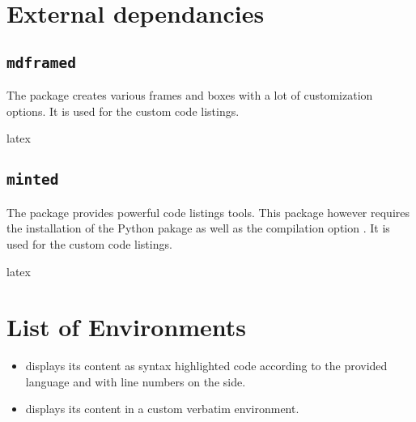 \documentclass{report}
\begin{document}
\section{External dependancies}


\subsection{\texttt{mdframed}}
The  package creates various frames and boxes with a lot of customization options. It is used for the custom code listings.

\begin{imtaCode}{latex}
    \RequirePackage{mdframed}
\end{imtaCode}


\subsection{\texttt{minted}}
The  package provides powerful code listings tools. This package however requires the installation of the Python pakage  as well as the compilation option . It is used for the custom code listings.

\begin{imtaCode}{latex}
    \RequirePackage{minted}
\end{imtaCode}



\section{List of Environments}
\begin{itemize}
    \item {} displays its content as syntax highlighted code according to the provided language and with line numbers on the side. 
    \item {} displays its content in a custom verbatim environment.
\end{itemize}


\end{document}
